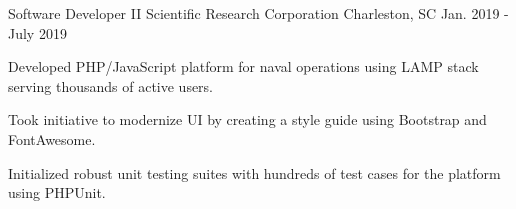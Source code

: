 \begin{cventries}
  \cventry
    {Software Developer II} %
    {Scientific Research Corporation} %
    {Charleston, SC} %
    {Jan. 2019 - July 2019} %
    {
      \begin{cvitems} %
        \item {Developed PHP/JavaScript platform for naval operations using LAMP stack serving thousands of active users.}
        \item {Took initiative to modernize UI by creating a style guide using Bootstrap and FontAwesome.}
        \item {Initialized robust unit testing suites with hundreds of test cases for the platform using PHPUnit.}
      \end{cvitems}
    }



\end{cventries}
